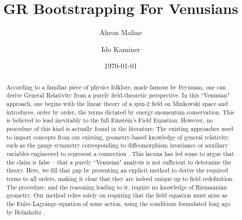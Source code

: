 \documentclass[aps,physrev,preprint,groupedaddress]{revtex4-2}
\begin{document}

\title{GR Bootstrapping For Venusians}


\author{Ahron Maline}
\affiliation{}

\author{Ido Kaminer}
\affiliation{}


\date{\today}

\begin{abstract}
According to a familiar piece of physics folklore, made famous by Feynman, one can derive General Relativity from a purely field-theoretic perspective. In this ``Venusian" approach, one begins with the linear theory of a spin-2 field on Minkowski space and introduces, order by order, the terms dictated by energy-momentum conservation. This is believed to lead inevitably to the full Einstein's Field Equation.
However, no procedure of this kind is actually found in the literature. The existing approaches need to import concepts from our existing, geometry-based knowledge of general relativity, such as the gauge symmetry corresponding to diffeomorphism invariance \cite{Feynlectures,Wald} or auxiliary variables engineered to represent a connection \cite{Deser}. This lacuna has led some \cite{Padmanabhan,Butcher,Barcelo} to argue that the claim is false -- that a purely ``Venusian" analysis is not sufficient to determine the theory. 
Here, we fill that gap by presenting an explicit method to derive the required terms to all orders, making it clear that they are indeed unique up to field redefinition. The procedure, and the reasoning leading to it, require no knowledge of Riemannian geometry. Our method relies solely on requiring that the field equation must arise as the Euler-Lagrange equation of some action, using the conditions formulated long ago by Helmholtz \cite{Helmholtz}.
\end{abstract}
\end{document}
